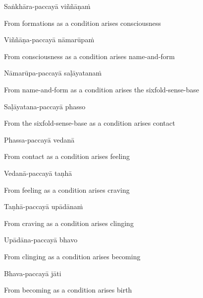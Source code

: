Saṅkhāra-paccayā viññāṇaṁ

\begin{cprenglish}
  From formations as a condition arises consciousness
\end{cprenglish}

Viññāṇa-paccayā nāmarūpaṁ

\begin{cprenglish}
  From consciousness as a condition arises name-and-form
\end{cprenglish}

Nāmarūpa-paccayā saḷāyatanaṁ

\begin{cprenglish}
  From name-and-form as a condition arises the sixfold-sense-base
\end{cprenglish}

Saḷāyatana-paccayā phasso

\begin{cprenglish}
  From the sixfold-sense-base as a condition arises contact
\end{cprenglish}

Phassa-paccayā vedanā

\begin{cprenglish}
  From contact as a condition arises feeling
\end{cprenglish}

Vedanā-paccayā taṇhā

\begin{cprenglish}
  From feeling as a condition arises craving
\end{cprenglish}

Taṇhā-paccayā upādānaṁ

\begin{cprenglish}
  From craving as a condition arises clinging
\end{cprenglish}

Upādāna-paccayā bhavo

\begin{cprenglish}
  From clinging as a condition arises becoming
\end{cprenglish}

Bhava-paccayā jāti

\begin{cprenglish}
  From becoming as a condition arises birth
\end{cprenglish}

